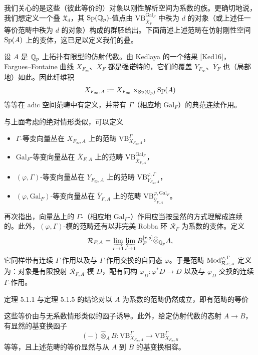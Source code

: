 我们关心的是这些（彼此等价的）对象以刚性解析空间为系数的族。更确切地说，我们想定义一个叠 $\mathfrak{X}_d$，其 $\operatorname{Sp}(\mathbb{Q}_p)$-值点由 $\mathrm{VB}^{\mathrm{Gal}_F}_{\overline{X}_F}$ 中秩为 $d$ 的对象（或上述任一等价范畴中秩为 $d$ 的对象）构成的群胚给出。下面简述上述范畴在仿射刚性空间 $\operatorname{Sp}(A)$ 上的变体，这已足以定义我们的叠。

设 $A$ 是 $\mathbb{Q}_p$ 上拓扑有限型的仿射代数。由 Kedlaya 的一个结果 [Ked16]，Fargues--Fontaine 曲线 $X_{F_\infty}$、$\overline{X}_F$ 都是强诺特的，它们的覆盖 $Y_{F_\infty}$、$\overline{Y}_F$ 也（局部地）如此。因此纤维积
\[
X_{F_\infty,A}:=X_{F_\infty}\times_{\operatorname{Sp}(\mathbb{Q}_p)}\operatorname{Sp}(A)
\]
等等在 adic 空间范畴中有定义，并带有 $\Gamma$（相应地 $\mathrm{Gal}_F$）的典范连续作用。

与上面考虑的绝对情形类似，可以定义
\begin{itemize}[leftmargin=1.8em,itemsep=0.15em]
\item $\Gamma$-等变向量丛在 $X_{F_\infty,A}$ 上的范畴 $\mathrm{VB}^{\Gamma}_{X_{F_\infty,A}}$，
\item $\mathrm{Gal}_F$-等变向量丛在 $\overline{X}_{F,A}$ 上的范畴 $\mathrm{VB}^{\mathrm{Gal}_F}_{\overline{X}_{F,A}}$，
\item $(\varphi,\Gamma)$-等变向量丛在 $Y_{F_\infty,A}$ 上的范畴 $\mathrm{VB}^{\varphi,\Gamma}_{Y_{F_\infty,A}}$，
\item $(\varphi,\mathrm{Gal}_F)$-等变向量丛在 $\overline{Y}_{F,A}$ 上的范畴 $\mathrm{VB}^{\varphi,\mathrm{Gal}_F}_{\overline{Y}_{F,A}}$。
\end{itemize}

再次指出，向量丛上的 $\Gamma$-（相应地 $\mathrm{Gal}_F$-）作用应当按显然的方式理解成连续的。此外，$(\varphi,\Gamma)$-模的范畴还有以非完美 Robba 环 $\mathcal{R}_F$ 为系数的变体。定义
\[
\mathcal{R}_{F,A}=\varinjlim_{r\to1}\varprojlim_{s\to1}B^{[r,s]}_F\widehat{\otimes}_{\mathbb{Q}_p}A,
\]
它同样带有连续 $\Gamma$-作用以及与 $\Gamma$-作用交换的自同态 $\varphi$。于是范畴 $\operatorname{Mod}^{\varphi,\Gamma}_{\mathcal{R}_{F,A}}$ 定义为：对象是有限投射 $\mathcal{R}_{F,A}$-模 $D$，配有同构 $\varphi_D:\varphi^*D\to D$ 以及与 $\varphi_D$ 交换的连续 $\Gamma$-作用。

定理 5.1.1 与定理 5.1.5 的结论对以 $A$ 为系数的范畴仍然成立，即有范畴的等价
\begin{center}
\end{center}
这些等价由与无系数情形类似的函子诱导。此外，给定仿射代数的态射 $A\to B$，有显然的基变换函子
\[
(-)\widehat{\otimes}_AB:\mathrm{VB}^{\Gamma}_{X_{F_\infty,A}}\longrightarrow\mathrm{VB}^{\Gamma}_{X_{F_\infty,B}}
\]
等等，且上述范畴的等价显然与从 $A$ 到 $B$ 的基变换相容。

